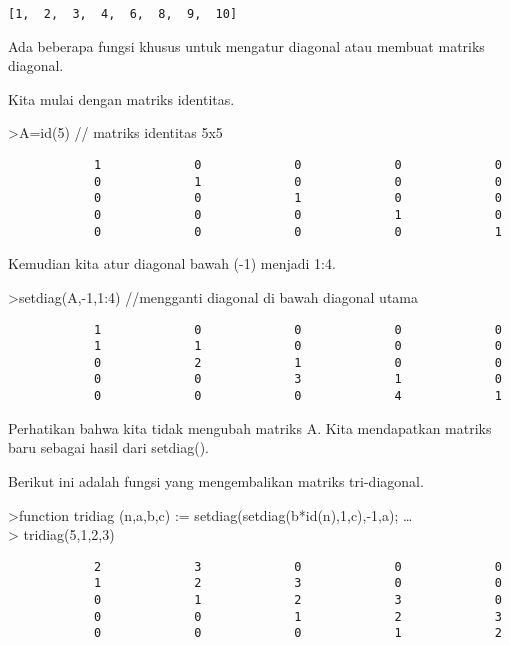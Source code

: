 \documentclass[
]{book}
\begin{document}
\begin{verbatim}
[1,  2,  3,  4,  6,  8,  9,  10]
\end{verbatim}

Ada beberapa fungsi khusus untuk mengatur diagonal atau membuat matriks diagonal.

Kita mulai dengan matriks identitas.

\textgreater A=id(5) // matriks identitas 5x5

\begin{verbatim}
            1             0             0             0             0 
            0             1             0             0             0 
            0             0             1             0             0 
            0             0             0             1             0 
            0             0             0             0             1 
\end{verbatim}

Kemudian kita atur diagonal bawah (-1) menjadi 1:4.

\textgreater setdiag(A,-1,1:4) //mengganti diagonal di bawah diagonal utama

\begin{verbatim}
            1             0             0             0             0 
            1             1             0             0             0 
            0             2             1             0             0 
            0             0             3             1             0 
            0             0             0             4             1 
\end{verbatim}

Perhatikan bahwa kita tidak mengubah matriks A. Kita mendapatkan matriks baru sebagai hasil dari setdiag().

Berikut ini adalah fungsi yang mengembalikan matriks tri-diagonal.

\textgreater function tridiag (n,a,b,c) := setdiag(setdiag(b*id(n),1,c),-1,a); \ldots{}\\
\textgreater{} tridiag(5,1,2,3)

\begin{verbatim}
            2             3             0             0             0 
            1             2             3             0             0 
            0             1             2             3             0 
            0             0             1             2             3 
            0             0             0             1             2 
\end{verbatim}
\end{document}

